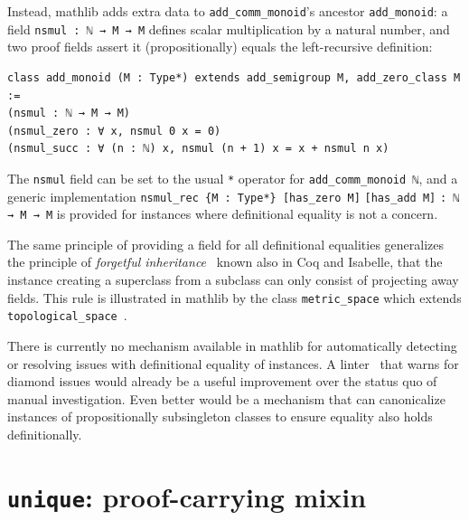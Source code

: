 \documentclass[a4paper,UKenglish,cleveref, autoref, thm-restate]{lipics-v2021}
\newcommand{\mathlib}{\textsf{mathlib}\xspace}
\begin{document}
Instead, \mathlib adds extra data to \lstinline{add_comm_monoid}'s ancestor \lstinline{add_monoid}:
a field \lstinline{nsmul : ℕ → M → M} defines scalar multiplication by a natural number,
and two proof fields assert it (propositionally) equals the left-recursive definition: %
\begin{lstlisting}
class add_monoid (M : Type*) extends add_semigroup M, add_zero_class M :=
(nsmul : ℕ → M → M)
(nsmul_zero : ∀ x, nsmul 0 x = 0)
(nsmul_succ : ∀ (n : ℕ) x, nsmul (n + 1) x = x + nsmul n x)
\end{lstlisting}
The \lstinline{nsmul} field can be set to the usual \lstinline{*} operator for \lstinline{add_comm_monoid ℕ},
and a generic implementation \lstinline|nsmul_rec {M : Type*} [has_zero M]| \lstinline|[has_add M]| \lstinline|: ℕ → M → M| is provided for instances where definitional equality is not a concern.


The same principle of providing a field for all definitional equalities
generalizes the principle of \emph{forgetful inheritance}~\cite{forgetful-inheritance} known also in Coq and Isabelle,
that the instance creating a superclass from a subclass can only consist of projecting away fields.
This rule is illustrated in \mathlib by the class \lstinline{metric_space} which extends \lstinline{topological_space}~\cite{perfectoid-spaces,mathlib}.

There is currently no mechanism available in \mathlib for automatically detecting or resolving issues with definitional equality of instances.
A linter~\cite{mathlib-linting} that warns for diamond issues would already be a useful improvement over the status quo of manual investigation.
Even better would be a mechanism that can canonicalize instances of propositionally subsingleton classes to ensure equality also holds definitionally.

\section{\lstinline{unique}: proof-carrying mixin} \label{sec:mixin}
\end{document}
